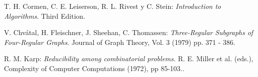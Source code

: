 \documentclass[10pt]{amsart}
\theoremstyle{definition}
\numberwithin{equation}{section}
\begin{document}
\bigskip
\begin{thebibliography}{20}
	
	 T. H. Cormen, C. E. Leiserson, R. L. Rivest y C. Stein: \emph{Introduction to Algorithms}. Third Edition.
	
	
	 V. Chv\'atal, H. Fleischner, J. Sheehan, C. Thomassen: \emph{Three-Regular Subgraphs of Four-Regular Graphs}. Journal of Graph Theory, Vol. 3 (1979) pp. 371 - 386.
	
	 R. M. Karp: \emph{Reducibility among combinatorial problems.} R. E. Miller et al. (eds.), Complexity of Computer Computations (1972), pp 85-103..	
	



	
\end{thebibliography}
\end{document}
